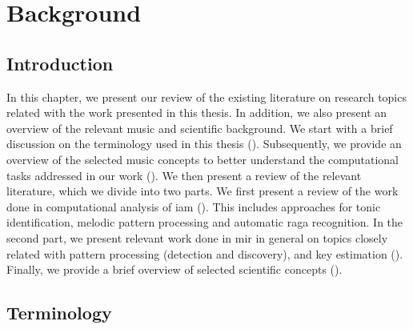 
\chapter{Background}
\label{chap:background}

\section{Introduction}

In this chapter, we present our review of the existing literature on research topics related with the work presented in this thesis. In addition, we also present an overview of the relevant music and scientific background. We start with a brief discussion on the terminology used in this thesis (). Subsequently, we provide an overview of the selected music concepts to better understand the computational tasks addressed in our work (). We then present a review of the relevant literature, which we divide into two parts. We first present a review of the work done in computational analysis of \gls{iam} (). This includes approaches for tonic identification, melodic pattern processing and automatic \gls{raga} recognition. In the second part, we present relevant work done in \gls{mir} in general on topics closely related with pattern processing (detection and discovery), and key estimation (). Finally, we provide a brief overview of selected scientific concepts ().%



\section{Terminology}
\label{sec:background_terminology}

